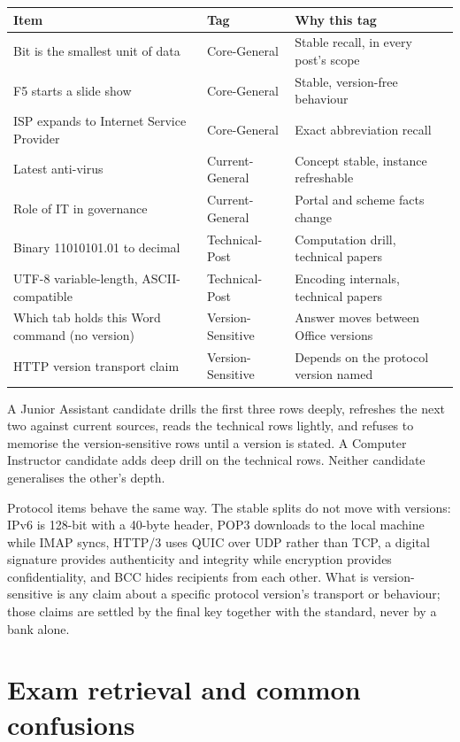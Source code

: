 \documentclass[11pt]{article}
\begin{document}
\begin{center}
\begin{tabular}{p{}p{}p{}}
\toprule
\textbf{Item} & \textbf{Tag} & \textbf{Why this tag} \\
\midrule
Bit is the smallest unit of data & Core-General & Stable recall, in every post's scope \\
F5 starts a slide show & Core-General & Stable, version-free behaviour \\
ISP expands to Internet Service Provider & Core-General & Exact abbreviation recall \\
Latest anti-virus & Current-General & Concept stable, instance refreshable \\
Role of IT in governance & Current-General & Portal and scheme facts change \\
Binary 11010101.01 to decimal & Technical-Post & Computation drill, technical papers \\
UTF-8 variable-length, ASCII-compatible & Technical-Post & Encoding internals, technical papers \\
Which tab holds this Word command (no version) & Version-Sensitive & Answer moves between Office versions \\
HTTP version transport claim & Version-Sensitive & Depends on the protocol version named \\
\bottomrule
\end{tabular}
\end{center}

A Junior Assistant candidate drills the first three rows deeply, refreshes the
next two against current sources, reads the technical rows lightly, and
refuses to memorise the version-sensitive rows until a version is stated. A
Computer Instructor candidate adds deep drill on the technical rows. Neither
candidate generalises the other's depth.

Protocol items behave the same way. The stable splits do not move with
versions: IPv6 is 128-bit with a 40-byte header, POP3 downloads to the local
machine while IMAP syncs, HTTP/3 uses QUIC over UDP rather than TCP, a
digital signature provides authenticity and integrity while encryption
provides confidentiality, and BCC hides recipients from each other. What is
version-sensitive is any claim about a specific protocol version's transport
or behaviour; those claims are settled by the final key together with the
standard, never by a bank alone.

\section{Exam retrieval and common confusions}
\end{document}
